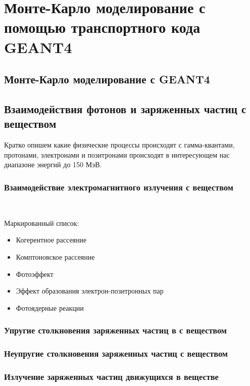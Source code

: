 \chapter{Монте-Карло моделирование с помощью транспортного кода GEANT4}\label{ch:theory}

\section{Монте-Карло моделирование с GEANT4
}\label{sec:theory/geant4}

\section{Взаимодействия фотонов и заряженных частиц с веществом
}\label{sec:theory/propagation}

Кратко опишем какие физические процессы происходят с гамма-квантами, протонами, электронами и позитронами происходят в интересующем нас диапазоне энергий до 150 МэВ.

\subsection{Взаимодействие электромагнитного излучения с веществом}

~\cite{bespalov2008, kolchuzkin1978, nemec1975}

\noindent Маркированный список:
\begin{itemize}
    \item Когерентное рассеяние
    \item Комптоновское рассеяние
    \item Фотоэффект
    \item Эффект образования  электрон-позитронных пар
    \item Фотоядерные реакции
\end{itemize}

\subsection{Упругие столкновения заряженных частиц в с веществом}

\subsection{Неупругие столкновения заряженных частиц с веществом}

\subsection{Излучение заряженных частиц движущихся в веществе}


